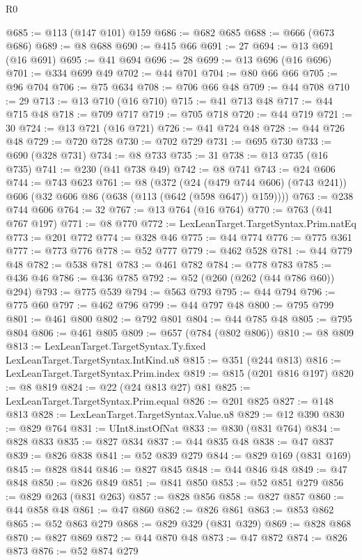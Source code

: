 \begin{lexlean}{R0}
\begin{coremodule}
{{{{{{{{{{{{{{{{{{{{{{{{{{{{{{{{{{{{{{{{{{{{{{{{{{{{{{{{{{{{{{{{{{{{{{{{{@685 := @113 (@147 @101) @159
@686 := @682 @685
@688 := @666 (@673 @686)
@689 := @8 @688
@690 := @415 @66
@691 := 27
@694 := @13 @691 (@16 @691)
@695 := @41 @694
@696 := 28
@699 := @13 @696 (@16 @696)
@701 := @334 @699 @49
@702 := @44 @701
@704 := @80 @66 @66
@705 := @96 @704
@706 := @75 @634
@708 := @706 @66 @48
@709 := @44 @708
@710 := 29
@713 := @13 @710 (@16 @710)
@715 := @41 @713 @48
@717 := @44 @715 @48
@718 := @709 @717
@719 := @705 @718
@720 := @44 @719
@721 := 30
@724 := @13 @721 (@16 @721)
@726 := @41 @724 @48
@728 := @44 @726 @48
@729 := @720 @728
@730 := @702 @729
@731 := @695 @730
@733 := @690 (@328 @731)
@734 := @8 @733
@735 := 31
@738 := @13 @735 (@16 @735)
@741 := @230 (@41 @738 @49)
@742 := @8 @741
@743 := @24 @606
@744 := @743 @623
@761 := @8
    (@372
      (@24 (@479 @744 @606) (@743 @241))
      @606
      (@32 @606 @86 (@638 (@113 (@642 (@598 @647)) @159))))
@763 := @238 @744 @606
@764 := 32
@767 := @13 @764 (@16 @764)
@770 := @763 (@41 @767 @197)
@771 := @8 @770
@772 := LexLeanTarget.TargetSyntax.Prim.natEq
@773 := @201 @772
@774 := @328 @46
@775 := @44 @774
@776 := @775 @361
@777 := @773 @776
@778 := @52 @777
@779 := @462 @528
@781 := @44 @779 @48
@782 := @538 @781
@783 := @461 @782
@784 := @778 @783
@785 := @436 @46
@786 := @436 @785
@792 := @52 (@260 (@262 (@44 @786 @60)) @294)
@793 := @775 @539
@794 := @563 @793
@795 := @44 @794
@796 := @775 @60
@797 := @462 @796
@799 := @44 @797 @48
@800 := @795 @799
@801 := @461 @800
@802 := @792 @801
@804 := @44 @785 @48
@805 := @795 @804
@806 := @461 @805
@809 := @657 (@784 (@802 @806))
@810 := @8 @809
@813 := LexLeanTarget.TargetSyntax.Ty.fixed LexLeanTarget.TargetSyntax.IntKind.u8
@815 := @351 (@244 @813)
@816 := LexLeanTarget.TargetSyntax.Prim.index
@819 := @815 (@201 @816 @197)
@820 := @8 @819
@824 := @22 (@24 @813 @27) @81
@825 := LexLeanTarget.TargetSyntax.Prim.equal
@826 := @201 @825
@827 := @148 @813
@828 := LexLeanTarget.TargetSyntax.Value.u8
@829 := @12 @390
@830 := @829 @764
@831 := UInt8.instOfNat
@833 := @830 (@831 @764)
@834 := @828 @833
@835 := @827 @834
@837 := @44 @835 @48
@838 := @47 @837
@839 := @826 @838
@841 := @52 @839 @279
@844 := @829 @169 (@831 @169)
@845 := @828 @844
@846 := @827 @845
@848 := @44 @846 @48
@849 := @47 @848
@850 := @826 @849
@851 := @841 @850
@853 := @52 @851 @279
@856 := @829 @263 (@831 @263)
@857 := @828 @856
@858 := @827 @857
@860 := @44 @858 @48
@861 := @47 @860
@862 := @826 @861
@863 := @853 @862
@865 := @52 @863 @279
@868 := @829 @329 (@831 @329)
@869 := @828 @868
@870 := @827 @869
@872 := @44 @870 @48
@873 := @47 @872
@874 := @826 @873
@876 := @52 @874 @279
}}}}}}}}}}}}}}}}}}}}}}}}}}}}}}}}}}}}}}}}}}}}}}}}}}}}}}}}}}}}}}}}}}}}}}}}}
\end{coremodule}
\end{lexlean}
